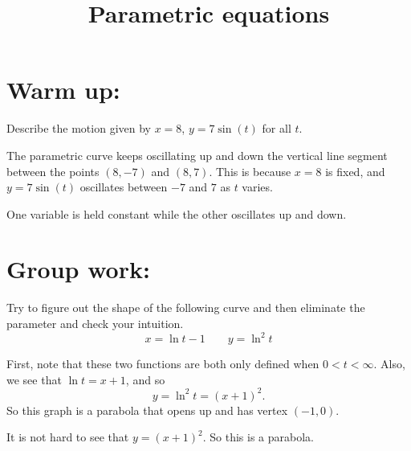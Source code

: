 \documentclass[]{ximera}
\title{Parametric equations}
\begin{document}
\begin{abstract}		\end{abstract}
\maketitle



\section{Warm up:}
Describe the motion given by $x=8$, $y=7 \sin (t)$ for all $t$.
	\begin{freeResponse}
	The parametric curve keeps oscillating up and down the vertical line segment between the points $(8,-7)$ and $(8,7)$.
	This is because $x=8$ is fixed, and $y = 7 \sin(t)$ oscillates between $-7$ and $7$ as $t$ varies.
	\end{freeResponse}
	
\begin{instructorNotes}
One variable is held constant while the other oscillates up and down.
\end{instructorNotes}







\section{Group work:}



\begin{problem}
Try to figure out the shape of the following curve and then eliminate the parameter and check your intuition.
	\[
	x = \ln t - 1 \qquad y = \ln^2 t
	\]
	\begin{freeResponse}
	First, note that these two functions are both only defined when $0 < t < \infty$.  
	Also, we see that $\ln t = x + 1$, and so 
		\[
		y = \ln^2 t = (x+1)^2.
		\]
	So this graph is a parabola that opens up and has vertex $(-1,0)$.  
	
	\end{freeResponse}
	
\end{problem}

\begin{instructorNotes}
It is not hard to see that $y = (x+1)^2$.  
So this is a parabola.  
\end{instructorNotes}
\end{document}
